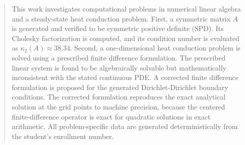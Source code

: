 \begin{abstract}

    This work investigates computational problems in numerical linear algebra
    and a steady-state heat conduction problem. First, a symmetric matrix $A$
    is generated and verified to be symmetric positive definite (SPD). Its
    Cholesky factorization is computed, and its condition number is evaluated
    as $\kappa_2(A) \approx 38.34$. Second, a one-dimensional heat conduction
    problem is solved using a prescribed finite difference formulation. The
    prescribed linear system is found to be algebraically solvable but
    mathematically inconsistent with the stated continuous PDE. A corrected
    finite difference formulation is proposed for the generated Dirichlet-Dirichlet
    boundary conditions. The corrected formulation reproduces the exact analytical
    solution at the grid points to machine precision, because the centered
    finite-difference operator is exact for quadratic solutions in exact arithmetic.
    All problem-specific data are generated deterministically from the
    student's enrollment number.

\end{abstract}